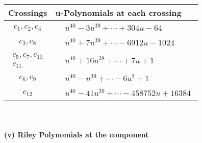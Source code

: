 \documentclass[1p]{elsarticle_modified}
\theoremstyle{definition}
\begin{document}
\begin{tabular}{m{50pt}|m{274pt}}
Crossings & \hspace{64pt}u-Polynomials at each crossing \\
\hline $$\begin{aligned}c_{1},c_{2},c_{4}\end{aligned}$$&$\begin{aligned}
&u^{40}-3 u^{39}+\cdots+304 u-64
\end{aligned}$\\
\hline $$\begin{aligned}c_{3},c_{8}\end{aligned}$$&$\begin{aligned}
&u^{40}+7 u^{39}+\cdots-6912 u-1024
\end{aligned}$\\
\hline $$\begin{aligned}c_{5},c_{7},c_{10}\\c_{11}\end{aligned}$$&$\begin{aligned}
&u^{40}+16 u^{38}+\cdots+7 u+1
\end{aligned}$\\
\hline $$\begin{aligned}c_{6},c_{9}\end{aligned}$$&$\begin{aligned}
&u^{40}- u^{39}+\cdots-6 u^2+1
\end{aligned}$\\
\hline $$\begin{aligned}c_{12}\end{aligned}$$&$\begin{aligned}
&u^{40}-41 u^{39}+\cdots-458752 u+16384
\end{aligned}$\\
\hline
\end{tabular}\\~\\
\newpage\renewcommand{\arraystretch}{1}
\flushleft \textbf{(v) Riley Polynomials at the component}\newline \\
\end{document}
